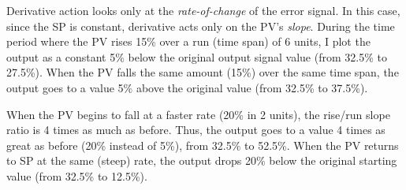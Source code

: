 Derivative action looks only at the {\it rate-of-change} of the error signal.  In this case, since the SP is constant, derivative acts only on the PV's {\it slope}.  During the time period where the PV rises 15\% over a run (time span) of 6 units, I plot the output as a constant 5\% below the original output signal value (from 32.5\% to 27.5\%).  When the PV falls the same amount (15\%) over the same time span, the output goes to a value 5\% above the original value (from 32.5\% to 37.5\%).

When the PV begins to fall at a faster rate (20\% in 2 units), the rise/run slope ratio is 4 times as much as before.  Thus, the output goes to a value 4 times as great as before (20\% instead of 5\%), from 32.5\% to 52.5\%.  When the PV returns to SP at the same (steep) rate, the output drops 20\% below the original starting value (from 32.5\% to 12.5\%).










